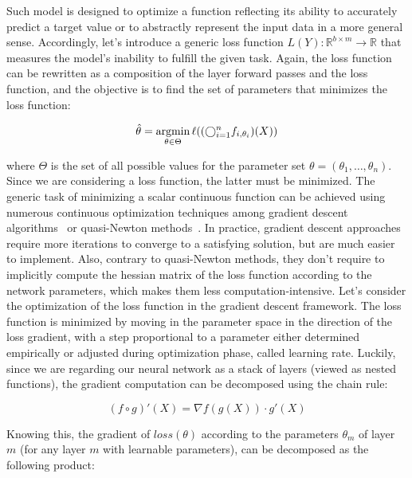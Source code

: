         Such model is designed to optimize a function reflecting its ability to accurately predict a target value or to abstractly represent the input 
        data in a more general sense. Accordingly, let's introduce a generic loss function $L(Y): \mathbb{R}^{b \times m} \rightarrow \mathbb{R}$ that measures 
        the model's inability to fulfill the given task. Again, the loss function can be rewritten as a composition of the layer forward passes and the loss
        function, and the objective is to find the set of parameters that minimizes the loss function:

        \begin{equation}
            \hat{\theta} = \operatorname*{argmin}_{\theta \in \Theta} \ell((\bigcirc_{i=1}^{n} f_{i, \theta_i})(X))
        \end{equation}

        where $\Theta$ is the set of all possible values for the parameter set $\theta = (\theta_1, \ldots, \theta_n)$.
        Since we are considering a loss function, the latter must be minimized. The generic task of minimizing a scalar continuous function can be achieved
        using numerous continuous optimization techniques  among gradient descent algorithms~\cite{DBLP:journals/corr/Ruder16}
        or quasi-Newton methods~\cite{LBFGS}. In practice, gradient descent approaches require more iterations to converge to a satisfying solution,
        but are much easier to implement. Also, contrary to quasi-Newton methods, they don't require to implicitly compute the hessian matrix of the loss
        function according to the network parameters, which makes them less computation-intensive. Let's consider the optimization of the loss function
        in the gradient descent framework. The loss function is minimized by moving in the parameter space in the direction of the loss gradient, with
        a step proportional to a parameter either determined empirically or adjusted during optimization phase, called learning rate.
        Luckily, since we are regarding our neural network as a stack of layers (viewed as nested functions), the gradient computation can be decomposed
        using the chain rule:

        \begin{equation} \label{eq:backprop}
            (f \circ g)'(X) = \nabla f(g(X)) \cdot g'(X)
        \end{equation}

        Knowing this, the gradient of $loss(\theta)$ according to the parameters $\theta_m$ of layer $m$ (for any layer $m$ with learnable parameters),
        can be decomposed as the following product:

